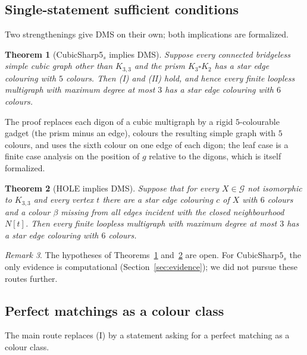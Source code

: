 \documentclass[11pt]{amsart}
\newtheorem{theorem}{Theorem}[section]
\theoremstyle{definition}
\theoremstyle{remark}
\newtheorem{remark}[theorem]{Remark}
\newcommand{\cG}{\mathcal{G}}
\newcommand{\hyp}[1]{\textup{(#1)}}
\begin{document}
\subsection{Single-statement sufficient conditions}
Two strengthenings give DMS on their own; both implications are formalized.

\begin{theorem}[CubicSharp5$_s$ implies DMS]\label{thm:cs5}
Suppose every connected bridgeless simple cubic graph other than $K_{3,3}$ and the prism $K_3\square K_2$ has a star edge colouring with $5$ colours. Then \hyp{I} and \hyp{II} hold, and hence every finite loopless multigraph with maximum degree at most $3$ has a star edge colouring with $6$ colours.
\end{theorem}
The proof replaces each digon of a cubic multigraph by a rigid $5$-colourable gadget (the prism minus an edge), colours the resulting simple graph with $5$ colours, and uses the sixth colour on one edge of each digon; the leaf case is a finite case analysis on the position of $g$ relative to the digons, which is itself formalized.

\begin{theorem}[HOLE implies DMS]\label{thm:hole}
Suppose that for every $X\in\cG$ not isomorphic to $K_{3,3}$ and every vertex $t$ there are a star edge colouring $c$ of $X$ with $6$ colours and a colour $\beta$ missing from all edges incident with the closed neighbourhood $N[t]$. Then every finite loopless multigraph with maximum degree at most $3$ has a star edge colouring with $6$ colours.
\end{theorem}

\begin{remark}
The hypotheses of Theorems~\ref{thm:cs5} and~\ref{thm:hole} are open. For CubicSharp$5_s$ the only evidence is computational (Section~\ref{sec:evidence}); we did not pursue these routes further.
\end{remark}

\subsection{Perfect matchings as a colour class}
The main route replaces \hyp{I} by a statement asking for a perfect matching as a colour class.
\end{document}
